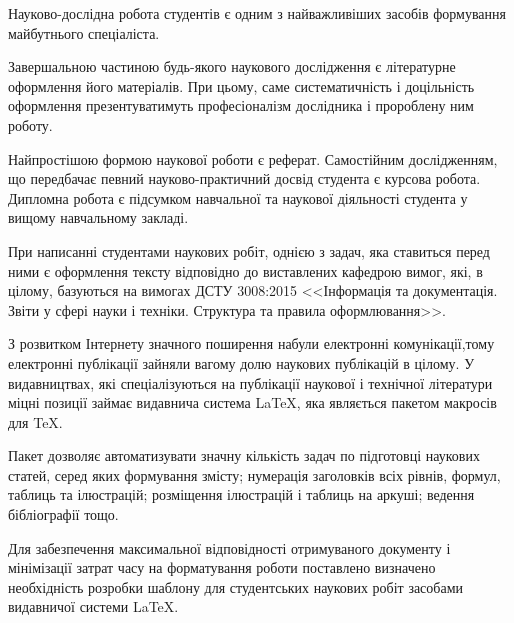 
Науково-дослідна робота студентів є одним з найважливіших засобів формування майбутнього спеціаліста.

Завершальною частиною будь-якого наукового дослідження є літературне оформлення його матеріалів. При цьому, саме систематичність і доцільність оформлення презентуватимуть професіоналізм дослідника і пророблену ним роботу.

Найпростішою формою наукової роботи є реферат. Самостійним   дослідженням, що передбачає певний науково-практичний досвід студента є курсова робота. Дипломна робота є підсумком навчальної та  наукової діяльності студента у вищому навчальному закладі.

При написанні студентами наукових робіт, однією з задач, яка ставиться перед ними є оформлення тексту відповідно до виставлених кафедрою вимог, які, в цілому, базуються на вимогах ДСТУ 3008:2015 <<Інформація та документація. Звіти у сфері науки і техніки. Структура та правила оформлювання>>.

З розвитком Інтернету значного поширення набули електронні комунікації,тому електронні публікації зайняли вагому долю наукових публікацій в цілому. У видавництвах, які спеціалізуються на публікації наукової і технічної літератури міцні позиції займає видавнича система  \LaTeX{}, яка являється пакетом макросів для \TeX{}.

Пакет дозволяє автоматизувати значну кількість задач по підготовці наукових статей, серед яких формування змісту; нумерація заголовків всіх рівнів, формул, таблиць та ілюстрацій; розміщення ілюстрацій і таблиць на аркуші; ведення бібліографії тощо.

Для забезпечення максимальної відповідності отримуваного документу і мінімізації затрат часу на форматування роботи поставлено визначено необхідність розробки шаблону для студентських наукових робіт засобами видавничої системи \LaTeX{}.